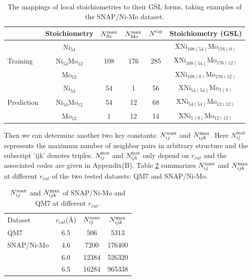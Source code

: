 \documentclass[preprint]{revtex4-2}
\begin{document}
% 
%
\begin{table}[h]
\centering
\begin{tabular}{lccccc}
\hline
 & Stoichiometry & $N^{\mathrm{max}}_{\mathrm{Ni}}$ & $N^{\mathrm{max}}_{\mathrm{Mo}}$ & $N^{\mathrm{vap}}$ 
 & Stoichiometry (GSL) \\
\hline
 & Ni$_{54}$ &  &  &  & XNi$_{108(54)}$Mo$_{176(0)}$ \\
Training & Ni$_{54}$Mo$_{12}$ & 108 & 176 & 285 
 & XNi$_{108(54)}$Mo$_{176(12)}$ \\
 & Mo$_{12}$ &  &  &  & XNi$_{108(0)}$Mo$_{176(12)}$ \\
\hline
 & Ni$_{54}$ & 54 & 1 & 56 & XNi$_{54(54)}$Mo$_{1(0)}$ \\
Prediction & Ni$_{54}$Mo$_{12}$ & 54 & 12 & 68 & XNi$_{54(54)}$Mo$_{12(12)}$ \\
 & Mo$_{12}$ & 1 & 12 & 14 & XNi$_{1(0)}$Mo$_{12(12)}$ \\
\hline
\end{tabular}
\caption{\label{table:GSL}
The mappings of local stoichiometries to their GSL forms, taking examples of the 
SNAP/Ni-Mo dataset.
}
\end{table}

Then we can determine another two key constants: $N_{ij}^{\mathrm{max}}$ and $N_{ijk}^{\mathrm{max}}$. 
Here $N_{ij}^{\mathrm{max}}$ represents the maximum number of neighbor pairs in
arbitrary structure and the subscript 'ijk' denotes triples. 
$N_{ij}^{\mathrm{max}}$ and $N_{ijk}^{\mathrm{max}}$ only depend on 
$r_{cut}$ and the associated codes are given in Appendix(B). 
Table \ref{table:nij_nijk_max} summarizes $N_{ij}^{\mathrm{max}}$ and $N_{ijk}^{\mathrm{max}}$ at different
$r_{cut}$ of the two tested datasets: QM7 and SNAP/Ni-Mo.

% 
%
\begin{table}[h]
\centering
\begin{tabular}{lccc}
\hline
 Dataset & $r_{cut}$(\AA) & $N_{ij}^{\mathrm{max}}$ & $N_{ijk}^{\mathrm{max}}$ \\
 QM7 & 6.5 & 506 & 5313 \\
\hline
 SNAP/Ni-Mo &  4.6 & 7200 & 176400 \\
 & 6.0 & 12384 & 526320 \\
 & 6.5 & 16284 & 965338 \\
\hline
\hline
\end{tabular}
\caption{\label{table:nij_nijk_max}
$N_{ij}^{\mathrm{max}}$ and $N_{ijk}^{\mathrm{max}}$ of SNAP/Ni-Mo and QM7 at different $r_{cut}$.
}
\end{table}
\end{document}
